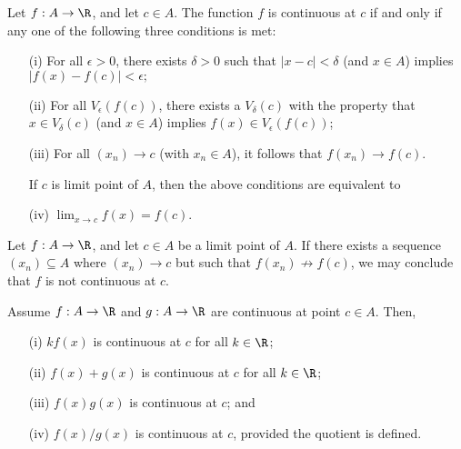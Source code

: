 \begin{tcolorbox}
    \begin{thm}
    Let \( f: A \to \R  \), and let \( c \in A  \). The function \( f \) is continuous at \( c \) if and only if any one of the following three conditions is met:
    \begin{enumerate}
        \item[(i)] For all \( \epsilon > 0  \), there exists \( \delta > 0  \) such that \( | x - c  | < \delta \) (and \( x \in A  \)) implies \( | f(x) - f(c) | < \epsilon; \)
        \item[(ii)] For all \( V_{\epsilon }(f(c)) \), there exists a \( V_{\delta}(c)  \) with the property that \( x \in V_{\delta} (c) \) (and \( x \in A  \)) implies \( f(x) \in V_{\epsilon }(f(c))  \);
        \item[(iii)] For all \( (x_n) \to c \) (with \( x_n \in A
            \)), it follows that \( f(x_n) \to f(c) \).

            If \( c \) is limit point of \( A  \), then the above conditions are equivalent to 
    \item[(iv)] \( \lim_{ x \to c } f(x)  = f(c)\).
    \end{enumerate}
    \end{thm}
\end{tcolorbox}

\begin{tcolorbox}
    \begin{cor}
    Let \( f: A \to \R  \), and let \( c \in A  \) be a limit point of \( A  \). If there exists a sequence \( (x_n) \subseteq A  \) where \( (x_n) \to c  \) but such that \( f(x_n) \not \to f(c) \), we may conclude that \( f \) is not continuous at \( c \).
    \end{cor}
\end{tcolorbox}
\begin{tcolorbox}
    \begin{thm} 
    Assume \( f: A \to \R  \) and \( g: A \to \R  \) are continuous at point \( c \in A  \). Then, 
    \begin{enumerate}
        \item[(i)] \( kf(x)  \) is continuous at \( c  \) for all \( k \in \R  \);
        \item[(ii)] \( f(x) + g(x) \) is continuous at \( c  \) for all \( k \in \R  \);
        \item[(iii)] \( f(x) g(x) \) is continuous at \( c  \); and 
        \item[(iv)] \( f(x) / g(x)  \) is continuous at \( c  \), provided the quotient is defined.
    \end{enumerate}
    \end{thm}
\end{tcolorbox}

